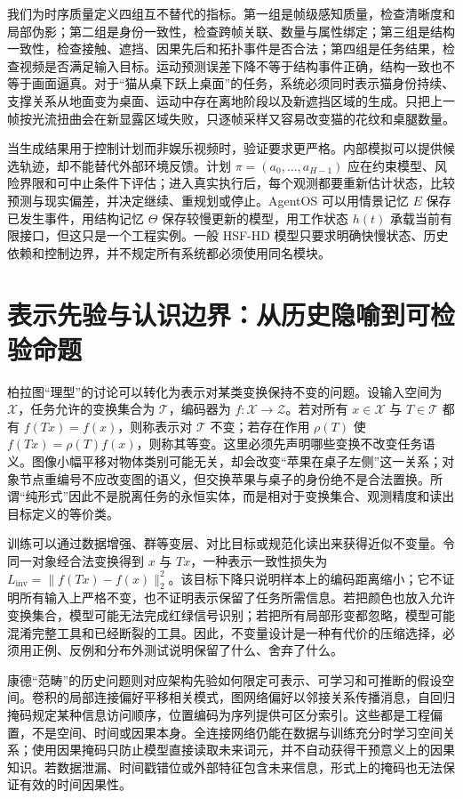 我们为时序质量定义四组互不替代的指标。第一组是帧级感知质量，检查清晰度和局部伪影；第二组是身份一致性，检查跨帧关联、数量与属性绑定；第三组是结构一致性，检查接触、遮挡、因果先后和拓扑事件是否合法；第四组是任务结果，检查视频是否满足输入目标。运动预测误差下降不等于结构事件正确，结构一致也不等于画面逼真。对于“猫从桌下跃上桌面”的任务，系统必须同时表示猫身份持续、支撑关系从地面变为桌面、运动中存在离地阶段以及新遮挡区域的生成。只把上一帧按光流扭曲会在新显露区域失败，只逐帧采样又容易改变猫的花纹和桌腿数量。

当生成结果用于控制计划而非娱乐视频时，验证要求更严格。内部模拟可以提供候选轨迹，却不能替代外部环境反馈。计划 $\pi=(a_0,\ldots,a_{H-1})$ 应在约束模型、风险界限和可中止条件下评估；进入真实执行后，每个观测都要重新估计状态，比较预测与现实偏差，并决定继续、重规划或停止。AgentOS 可以用情景记忆 $E$ 保存已发生事件，用结构记忆 $\Theta$ 保存较慢更新的模型，用工作状态 $h(t)$ 承载当前有限接口，但这只是一个工程实例。一般 HSF-HD 模型只要求明确快慢状态、历史依赖和控制边界，并不规定所有系统都必须使用同名模块。

\section{表示先验与认识边界：从历史隐喻到可检验命题}
\label{sec:morpho_elements_1}

柏拉图“理型”的讨论可以转化为表示对某类变换保持不变的问题。设输入空间为 $\mathcal X$，任务允许的变换集合为 $\mathcal T$，编码器为 $f:\mathcal X\to\mathcal Z$。若对所有 $x\in\mathcal X$ 与 $T\in\mathcal T$ 都有 $f(Tx)=f(x)$，则称表示对 $\mathcal T$ 不变；若存在作用 $\rho(T)$ 使 $f(Tx)=\rho(T)f(x)$，则称其等变。这里必须先声明哪些变换不改变任务语义。图像小幅平移对物体类别可能无关，却会改变“苹果在桌子左侧”这一关系；对象节点重编号不应改变图的语义，但交换苹果与桌子的身份绝不是合法置换。所谓“纯形式”因此不是脱离任务的永恒实体，而是相对于变换集合、观测精度和读出目标定义的等价类。

训练可以通过数据增强、群等变层、对比目标或规范化读出来获得近似不变量。令同一对象经合法变换得到 $x$ 与 $T x$，一种表示一致性损失为 $L_{\mathrm{inv}}=\|f(Tx)-f(x)\|_2^2$。该目标下降只说明样本上的编码距离缩小；它不证明所有输入上严格不变，也不证明表示保留了任务所需信息。若把颜色也放入允许变换集合，模型可能无法完成红绿信号识别；若把所有局部形变都忽略，模型可能混淆完整工具和已经断裂的工具。因此，不变量设计是一种有代价的压缩选择，必须用正例、反例和分布外测试说明保留了什么、舍弃了什么。

\label{sec:kant_categories}
康德“范畴”的历史问题则对应架构先验如何限定可表示、可学习和可推断的假设空间。卷积的局部连接偏好平移相关模式，图网络偏好以邻接关系传播消息，自回归掩码规定某种信息访问顺序，位置编码为序列提供可区分索引。这些都是工程偏置，不是空间、时间或因果本身。全连接网络仍能在数据与训练充分时学习空间关系；使用因果掩码只防止模型直接读取未来词元，并不自动获得干预意义上的因果知识。若数据泄漏、时间戳错位或外部特征包含未来信息，形式上的掩码也无法保证有效的时间因果性。

